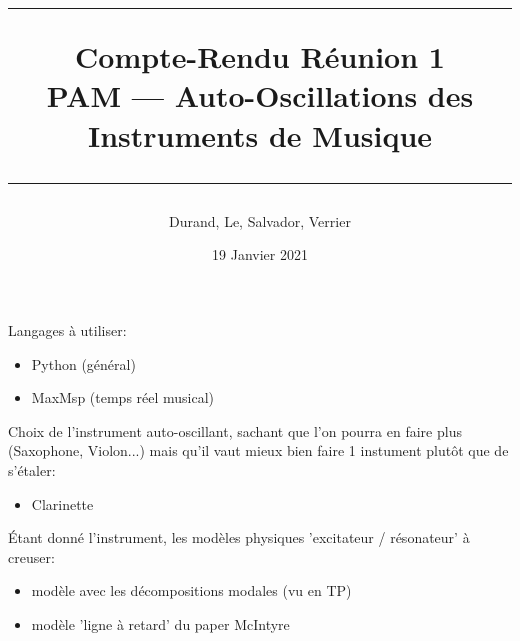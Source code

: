 \documentclass[a4paper, 11pt]{article}
\title{
	\noindent\rule{\linewidth}{0.4pt}
	\huge{Compte-Rendu Réunion 1\\}
	\medskip
	\Large{PAM --- Auto-Oscillations des Instruments de Musique}
	\noindent\rule{\linewidth}{1pt}
}
\author{Durand, Le, Salvador, Verrier}
\date{19 Janvier 2021}
\begin{document}
\maketitle

Langages à utiliser:
\begin{itemize}
\item Python (général)
\item MaxMsp (temps réel musical)
\end{itemize}

\bigskip

Choix de l'instrument auto-oscillant, sachant que l'on pourra en faire plus (Saxophone, Violon...) mais qu'il vaut mieux bien faire 1 instument plutôt que de s'étaler:
\begin{itemize}
\item Clarinette
\end{itemize}

\bigskip

Étant donné l'instrument, les modèles physiques 'excitateur / résonateur' à creuser:
\begin{itemize}
\item modèle avec les décompositions modales (vu en TP)
\item modèle 'ligne à retard' du paper McIntyre
\end{itemize}

\bigskip
\end{document}

